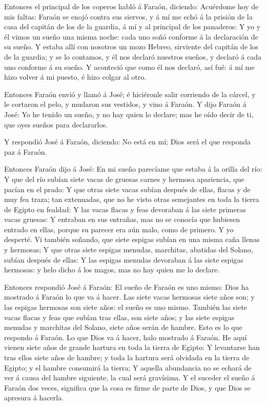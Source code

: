  Entonces el principal de los coperos habló á Faraón,
diciendo: Acuérdome hoy de mis faltas:  Faraón se enojó
contra sus siervos, y á mí me echó á la prisión de la casa del capitán
de los de la guardia, á mí y al principal de los panaderos:
 Y yo y él vimos un sueño una misma noche: cada uno soñó
conforme á la declaración de su sueño.  Y estaba allí con
nosotros un mozo Hebreo, sirviente del capitán de los de la guardia; y
se lo contamos, y él nos declaró nuestros sueños, y declaró á cada uno
conforme á su sueño.  Y aconteció que como él nos declaró,
así fué: á mí me hizo volver á mi puesto, é hizo colgar al otro.

 Entonces Faraón envió y llamó á José; é hiciéronle salir
corriendo de la cárcel, y le cortaron el pelo, y mudaron sus vestidos, y
vino á Faraón.  Y dijo Faraón á José: Yo he tenido un
sueño, y no hay quien lo declare; mas he oído decir de ti, que oyes
sueños para declararlos.

 Y respondió José á Faraón, diciendo: No está en mí; Dios
será el que responda paz á Faraón.

 Entonces Faraón dijo á José: En mi sueño parecíame que
estaba á la orilla del río:  Y que del río subían siete
vacas de gruesas carnes y hermosa apariencia, que pacían en el prado:
 Y que otras siete vacas subían después de ellas, flacas y
de muy fea traza; tan extenuadas, que no he visto otras semejantes en
toda la tierra de Egipto en fealdad:  Y las vacas flacas y
feas devoraban á las siete primeras vacas gruesas:  Y
entraban en sus entrañas, mas no se conocía que hubiesen entrado en
ellas, porque su parecer era aún malo, como de primero. Y yo desperté.
 Vi también soñando, que siete espigas subían en una misma
caña llenas y hermosas;  Y que otras siete espigas menudas,
marchitas, abatidas del Solano, subían después de ellas:  Y
las espigas menudas devoraban á las siete espigas hermosas: y helo dicho
á los magos, mas no hay quien me lo declare.

 Entonces respondió José á Faraón: El sueño de Faraón es
uno mismo: Dios ha mostrado á Faraón lo que va á hacer. 
Las siete vacas hermosas siete años son; y las espigas hermosas son
siete años: el sueño es uno mismo.  También las siete vacas
flacas y feas que subían tras ellas, son siete años; y las siete espigas
menudas y marchitas del Solano, siete años serán de hambre.
 Esto es lo que respondo á Faraón. Lo que Dios va á hacer,
halo mostrado á Faraón.  He aquí vienen siete años de
grande hartura en toda la tierra de Egipto:  Y levantarse
han tras ellos siete años de hambre; y toda la hartura será olvidada en
la tierra de Egipto; y el hambre consumirá la tierra;  Y
aquella abundancia no se echará de ver á causa del hambre siguiente, la
cual será gravísima.  Y el suceder el sueño á Faraón dos
veces, significa que la cosa es firme de parte de Dios, y que Dios se
apresura á hacerla.

